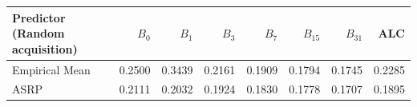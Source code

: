 \begin{tabular}{lrrrrrrr}
\toprule
Predictor (Random acquisition) & $B_0$ & $B_1$ & $B_3$ & $B_7$ & $B_{15}$ & $B_{31}$ & ALC\\
\midrule
Empirical Mean & 0.2500 & 0.3439 & 0.2161 & 0.1909 & 0.1794 & 0.1745 & 0.2285\\
ASRP & 0.2111 & 0.2032 & 0.1924 & 0.1830 & 0.1778 & 0.1707 & 0.1895\\
\bottomrule
\end{tabular}
